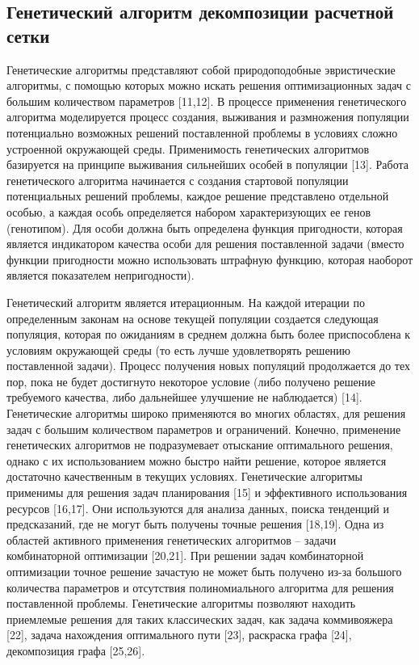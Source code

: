 \subsection{Генетический алгоритм декомпозиции расчетной сетки}\label{sec:text_2_genetic}

Генетические алгоритмы представляют собой природоподобные эвристические алгоритмы, с помощью которых можно искать решения оптимизационных задач с большим количеством параметров [11,12].
В процессе применения генетического алгоритма моделируется процесс создания, выживания и размножения популяции потенциально возможных решений поставленной проблемы в условиях сложно устроенной окружающей среды.
Применимость генетических алгоритмов базируется на принципе выживания сильнейших особей в популяции [13].
Работа генетического алгоритма начинается с создания стартовой популяции потенциальных решений проблемы, каждое решение представлено отдельной особью, а каждая особь определяется набором характеризующих ее генов (генотипом).
Для особи должна быть определена функция пригодности, которая является индикатором качества особи для решения поставленной задачи (вместо функции пригодности можно использовать штрафную функцию, которая наоборот является показателем непригодности). 

Генетический алгоритм является итерационным.
На каждой итерации по определенным законам на основе текущей популяции создается следующая популяция, которая по ожиданиям в среднем должна быть более приспособлена к условиям окружающей среды (то есть лучше удовлетворять решению поставленной задачи).
Процесс получения новых популяций продолжается до тех пор, пока не будет достигнуто некоторое условие (либо получено решение требуемого качества, либо дальнейшее улучшение не наблюдается) [14].
Генетические алгоритмы широко применяются во многих областях, для решения задач с большим количеством параметров и ограничений.
Конечно, применение генетических алгоритмов не подразумевает отыскание оптимального решения, однако с их использованием можно быстро найти решение, которое является достаточно качественным в текущих условиях.
Генетические алгоритмы применимы для решения задач планирования [15] и эффективного использования ресурсов [16,17].
Они используются для анализа данных, поиска тенденций и предсказаний, где не могут быть получены точные решения [18,19].
Одна из областей активного применения генетических алгоритмов – задачи комбинаторной оптимизации [20,21].
При решении задач комбинаторной оптимизации точное решение зачастую не может быть получено из-за большого количества параметров и отсутствия полиномиального алгоритма для решения поставленной проблемы.
Генетические алгоритмы позволяют находить приемлемые решения для таких классических задач, как задача коммивояжера [22], задача нахождения оптимального пути [23], раскраска графа [24], декомпозиция графа [25,26].

